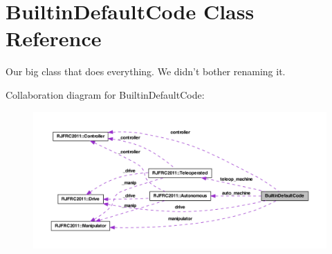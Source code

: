 \hypertarget{class_builtin_default_code}{
\section{BuiltinDefaultCode Class Reference}
\label{class_builtin_default_code}
}


Our big class that does everything. We didn't bother renaming it.  




Collaboration diagram for BuiltinDefaultCode:\nopagebreak
\begin{figure}[H]
\begin{center}
\leavevmode
\includegraphics[width=400pt]{class_builtin_default_code__coll__graph}
\end{center}
\end{figure}
